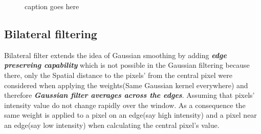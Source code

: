 \documentclass[a4paper,11pt]{article}%
\begin{document}
\begin{figure}[!h]
	\centering
\caption{caption goes here}
\end{figure}


\subsection{Bilateral filtering}

Bilateral filter extends the idea of Gaussian smoothing by adding \textbf{\textit{edge preserving capability}} which is not possible in the Gaussian filtering because there, only the Spatial distance to the pixels' from the central pixel were considered when applying the weights(Same Gaussian kernel everywhere) and therefore \textbf{\textit{Gaussian filter averages across the edges}}. Assuming that pixels' intensity value do not change rapidly over the window. As a consequence the same weight is applied to a pixel on an edge(say high intensity) and a pixel near an edge(say low intensity) when calculating the central pixel's value.\\
\end{document}
